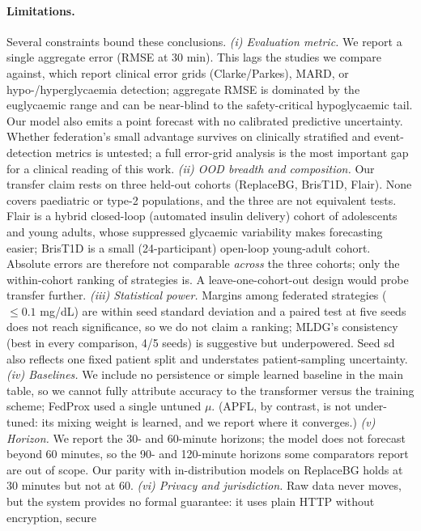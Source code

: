 \documentclass[10pt,letterpaper]{article}
\begin{document}
\paragraph{Limitations.} Several constraints bound these conclusions.
\emph{(i) Evaluation metric.} We report a single aggregate error (RMSE at 30
min). This lags the studies we compare against, which report clinical error grids
(Clarke/Parkes), MARD, or hypo-/hyperglycaemia detection; aggregate RMSE is
dominated by the euglycaemic range and can be near-blind to the
safety-critical hypoglycaemic tail. Our model also emits a point forecast with
no calibrated predictive uncertainty. Whether federation's small advantage
survives on clinically stratified and event-detection metrics is untested; a
full error-grid analysis is the most important gap for a clinical reading of
this work.
\emph{(ii) OOD breadth and composition.} Our transfer claim rests on three
held-out cohorts (ReplaceBG, BrisT1D, Flair). None covers paediatric or type-2
populations, and the three are not equivalent tests. Flair is a hybrid
closed-loop (automated insulin delivery) cohort of adolescents and young
adults, whose suppressed glycaemic variability makes forecasting easier;
BrisT1D is a small (24-participant) open-loop young-adult cohort.
Absolute errors are therefore not comparable \emph{across} the three cohorts;
only the within-cohort ranking of strategies is. A leave-one-cohort-out design
would probe transfer further. \emph{(iii) Statistical power.} Margins among federated strategies
($\le 0.1$ mg/dL) are within seed standard deviation and a paired test at five
seeds does not reach significance, so we do not claim a ranking; MLDG's
consistency (best in every comparison, 4/5 seeds) is suggestive but underpowered.
Seed sd also reflects one fixed patient split and understates patient-sampling
uncertainty. \emph{(iv) Baselines.} We include no persistence or simple
learned baseline in the main table, so we cannot fully attribute accuracy to
the transformer versus the training scheme; FedProx used a single untuned
$\mu$. (APFL, by contrast, is not under-tuned: its mixing weight is learned,
and we report where it converges.) \emph{(v) Horizon.} We report the 30- and
60-minute horizons; the model does not forecast beyond 60 minutes, so the 90-
and 120-minute horizons some comparators report are out of scope. Our parity
with in-distribution models on ReplaceBG holds at 30 minutes but not at 60.
\emph{(vi) Privacy and jurisdiction.} Raw data never moves, but the system
provides no formal guarantee: it uses plain HTTP without encryption, secure
\end{document}
